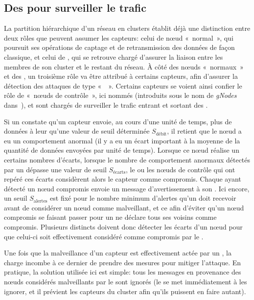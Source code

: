     \subsection{Des \cns pour surveiller le trafic}

La partition hiérarchique d'un réseau en clusters établit déjà une distinction entre deux rôles que peuvent assumer les capteurs: celui de nœud « normal », qui poursuit ses opérations de captage et de retransmission des données de façon classique, et celui de \ch, qui se retrouve chargé d'assurer la liaison entre les membres de son cluster et le restant du réseau.
À côté des nœuds «~normaux~» et des \chs, un troisième rôle va être attribué à certains capteurs, afin d'assurer la détection des attaques de type «~\dds~».
Certains capteurs se voient ainsi confier le rôle de «~nœuds de contrôle~», ici nommés \cns (introduits sous le nom de \textit{gNodes} dans~\cite{LC08}), et sont chargés de surveiller le trafic entrant et sortant des \chs.

Si un \cn constate qu'un capteur envoie, au cours d'une unité de temps, plus de données à leur \CH qu'une valeur de seuil déterminée $S_{\textrm{débit}}$, il retient que le nœud a eu un comportement anormal (il y a eu un écart important à la moyenne de la quantité de données envoyées par unité de temps).
Lorsque ce nœud réalise un certains nombres d'écarts, \cad lorsque le nombre de comportement anormaux détectés par un \cn dépasse une valeur de seuil $S_{\textrm{écarts}}$, le ou les nœuds de contrôle qui ont repéré ces écarts considèrent alors le capteur comme compromis.
Chaque \cn ayant détecté un nœud compromis envoie un message d'avertissement à son \ch.
Ici encore, un seuil $S_{\textrm{alertes}}$ est fixé pour le nombre minimum d'alertes qu'un \CH doit recevoir avant de considérer un nœud comme malveillant, et ce afin d'éviter qu'un nœud compromis se faisant passer pour un \cn ne déclare tous ses voisins comme compromis.
Plusieurs \cns distincts doivent donc détecter les écarts d'un nœud pour que celui-ci soit effectivement considéré comme compromis par le \ch.

Une fois que la malveillance d'un capteur est effectivement actée par un \ch, la charge incombe à ce dernier de prendre des mesures pour mitiger l'attaque.
En pratique, la solution utilisée ici est simple: tous les messages en provenance des nœuds considérés malveillants par le \ch sont ignorés (le \CH se met immédiatement à les ignorer, et il prévient les capteurs du cluster afin qu'ils puissent en faire autant).

